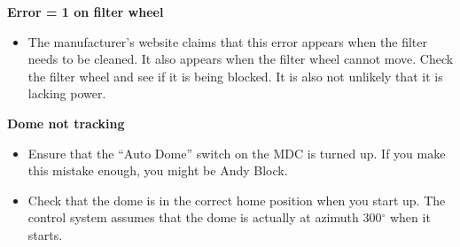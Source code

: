 \documentclass[letterpaper, 12pt]{report}
\begin{document}
\noindent\textbf{Error = 1 on filter wheel}
\begin{itemize}
	\item The manufacturer's website claims that this error appears when the filter needs to be cleaned. It also appears when the filter wheel cannot move. Check the filter wheel and see if it is being blocked. It is also not unlikely that it is lacking power.
\end{itemize}
\noindent \textbf{Dome not tracking}
\begin{itemize}
	\item Ensure that the ``Auto Dome'' switch on the MDC is turned up. If you make this mistake enough, you might be Andy Block.
	\item Check that the dome is in the correct home position when you start up. The control system assumes that the dome is actually at azimuth 300$^\circ$ when it starts.
\end{itemize}
\end{document}
